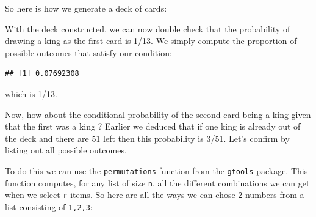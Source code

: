 \documentclass[
  openany]{book}
\newenvironment{Shaded}{\begin{snugshade}}{\end{snugshade}}
\newcommand{\DataTypeTok}[1]{\textcolor[rgb]{0.13,0.29,0.53}{#1}}
\newcommand{\KeywordTok}[1]{\textcolor[rgb]{0.13,0.29,0.53}{\textbf{#1}}}
\newcommand{\NormalTok}[1]{#1}
\newcommand{\OperatorTok}[1]{\textcolor[rgb]{0.81,0.36,0.00}{\textbf{#1}}}
\newcommand{\StringTok}[1]{\textcolor[rgb]{0.31,0.60,0.02}{#1}}
\begin{document}
So here is how we generate a deck of cards:

\begin{Shaded}
\end{Shaded}

With the deck constructed, we can now double check that the probability of drawing a king as the first card is 1/13. We simply compute the proportion of possible outcomes that satisfy our condition:

\begin{Shaded}
\end{Shaded}

\begin{verbatim}
## [1] 0.07692308
\end{verbatim}

which is 1/13.

Now, how about the conditional probability of the second card being a king given that the first was a king ? Earlier we deduced that if one king is already out of the deck and there are 51 left then this probability is 3/51.
Let's confirm by listing out all possible outcomes.

To do this we can use the \texttt{permutations} function from the \texttt{gtools} package. This function computes, for any list of size \texttt{n}, all the different combinations we can get when we select \texttt{r} items. So here are all the ways we can chose 2 numbers from a list consisting of \texttt{1,2,3}:
\end{document}
